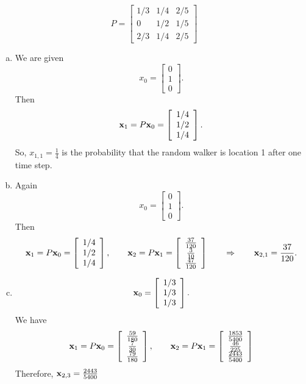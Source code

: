 \vspace{2mm}
$$
P=\left[\begin{array}{ccc}1/3&1/4&2/5\\0&1/2&1/5\\2/3&1/4&2/5\end{array} \right]
$$
\begin{enumerate}[a)]
  \item We are given
$$
x_0=\left[\begin{array}{c}0\\1\\0\end{array}\right].
$$
Then
$$
{\bf x}_1=P{\bf x}_0=\left[\begin{array}{c}1/4\\1/2\\1/4\end{array}\right].
$$
So, $x_{1,1}=\frac{1}{4}$ is the probability that the random walker is location 1 after one time step.
	\item
Again
$$
x_0=\left[\begin{array}{c}0\\1\\0\end{array}\right].
$$
Then
$$
{\bf x}_1=P{\bf x}_0=\left[\begin{array}{c}1/4\\1/2\\1/4\end{array}\right],\qquad
{\bf x}_2=P{\bf x}_1=\left[\begin{array}{c}\frac{37}{120}\\\frac{3}{10}\\\frac{47}{120}\end{array}\right]\qquad\Rightarrow\qquad
{\bf x}_{2,1}=\frac{37}{120}.
$$
	\item
$$
{\bf x}_0=\left[\begin{array}{c}1/3\\1/3\\1/3\end{array}\right].
$$
We have
\begin{eqnarray*}
{\bf x}_1=P{\bf x}_0=\left[\begin{array}{c}\frac{59}{180}\\\frac{7}{30}\\\frac{79}{180}\end{array}\right],\qquad
{\bf x}_2=P{\bf x}_1=\left[\begin{array}{c}\frac{1853}{5400}\\ \frac{46}{225}\\ \frac{2443}{5400}\end{array}\right]
\end{eqnarray*}
Therefore, ${\bf x}_{2,3}=\frac{2443}{5400}$
\end{enumerate}

